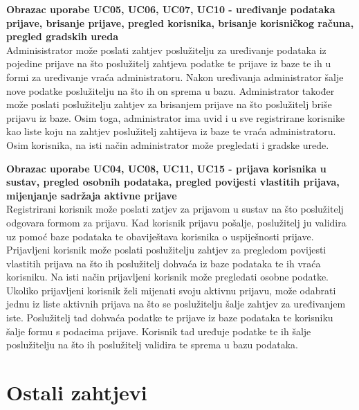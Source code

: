 				\textbf{Obrazac uporabe UC05, UC06, UC07, UC10 - uređivanje podataka prijave, brisanje prijave, pregled korisnika, brisanje korisničkog računa, pregled gradskih ureda}\\
				Adminisistrator može poslati zahtjev poslužitelju za uređivanje podataka iz pojedine prijave na što poslužitelj zahtjeva podatke te prijave iz baze te ih u formi za uređivanje vraća administratoru. Nakon uređivanja administrator šalje nove podatke poslužitelju na što ih on sprema u bazu.
				Administrator također može poslati poslužitelju zahtjev za brisanjem prijave na što poslužitelj briše prijavu iz baze.
				Osim toga, administrator ima uvid i u sve registrirane korisnike kao liste koju na zahtjev poslužitelj zahtijeva iz baze te vraća administratoru.
				Osim korisnika, na isti način administrator može pregledati i gradske urede.

				\textbf{Obrazac uporabe UC04, UC08, UC11, UC15 - prijava korisnika u sustav, pregled osobnih podataka, pregled povijesti vlastitih prijava, mijenjanje sadržaja aktivne prijave}\\
				Registrirani korisnik može poslati zatjev za prijavom u sustav na što poslužitelj odgovara formom za prijavu. Kad korisnik prijavu pošalje, poslužitelj ju validira uz pomoć baze podataka te obaviještava korisnika o uspiješnosti prijave. Prijavljeni korisnik može poslati poslužitelju zahtjev za pregledom povijesti vlastitih prijava na što ih poslužitelj dohvaća iz baze podataka te ih vraća korisniku. Na isti način prijavljeni korisnik može pregledati osobne podatke.
				Ukoliko prijavljeni korisnik želi mijenati svoju aktivnu prijavu, može odabrati jednu iz liste aktivnih prijava na što se poslužitelju šalje zahtjev za uređivanjem iste. Poslužitelj tad dohvaća podatke te prijave iz baze podataka te korisniku šalje formu s podacima prijave. Korisnik tad uređuje podatke te ih šalje poslužitelju na što ih poslužitelj validira te sprema u bazu podataka.

				\eject
	
		\section{Ostali zahtjevi}
		
